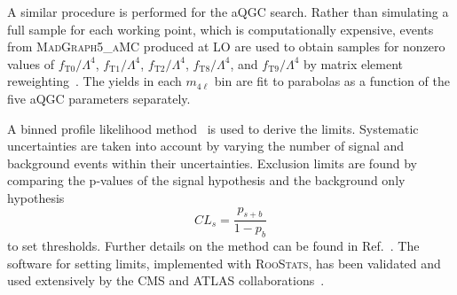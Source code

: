 A similar procedure is performed for the aQGC search.
Rather than simulating a full sample for each working point, which is computationally expensive, events from \textsc{MadGraph5\_aMC} produced at LO are used to obtain samples for nonzero values of $f_\text{T0} / \Lambda^4$, $f_\text{T1} / \Lambda^4$, $f_\text{T2} / \Lambda^4$, $f_\text{T8} / \Lambda^4$, and $f_\text{T9} / \Lambda^4$ by matrix element reweighting~\cite{Alwall:2014hca}.
The yields in each $m_{4\ell}$ bin are fit to parabolas as a function of the five aQGC parameters separately.

A binned profile likelihood method~\cite{Olive:2016xmw} is used to derive the limits.
Systematic uncertainties are taken into account by varying the number of signal and background events within their uncertainties.
Exclusion limits are found by comparing the p-values of the signal hypothesis and the background only hypothesis
\begin{equation}
  CL_s = \frac{p_{s+b}}{1-p_b}
\end{equation}
to set thresholds.
Further details on the method can be found in Ref.~\cite{Cowan:2010js}.
The software for setting limits, implemented with \textsc{RooStats}, has been validated and used extensively by the CMS and ATLAS collaborations~\cite{CMS:2016nxa}.

